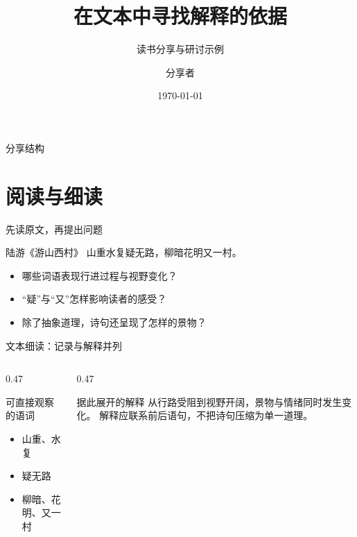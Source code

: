 \documentclass[aspectratio=169]{ctexbeamer}
\title{在文本中寻找解释的依据}
\subtitle{读书分享与研讨示例}
\author{分享者}
\institute{湖南文理学院}
\date{\today}
\begin{document}
\HUASmaketitle
\begin{frame}{分享结构}
  \tableofcontents[hideallsubsections]
\end{frame}
\section{阅读与细读}
\begin{frame}{先读原文，再提出问题}
  \begin{HUASquotation}{陆游《游山西村》}
    山重水复疑无路，柳暗花明又一村。
  \end{HUASquotation}
  \medskip
  \begin{itemize}
    \item 哪些词语表现行进过程与视野变化？
    \item “疑”与“又”怎样影响读者的感受？
    \item 除了抽象道理，诗句还呈现了怎样的景物？
  \end{itemize}
\end{frame}
\begin{frame}{文本细读：记录与解释并列}
  \begin{columns}[T,onlytextwidth]
    \begin{column}{0.47\textwidth}
      \begin{block}{可直接观察的语词}
        \begin{itemize}
          \item 山重、水复
          \item 疑无路
          \item 柳暗、花明、又一村
        \end{itemize}
      \end{block}
    \end{column}
    \begin{column}{0.47\textwidth}
      \begin{exampleblock}{据此展开的解释}
        从行路受阻到视野开阔，景物与情绪同时发生变化。
        解释应联系前后语句，不把诗句压缩为单一道理。
      \end{exampleblock}
    \end{column}
  \end{columns}
\end{frame}
\end{document}
